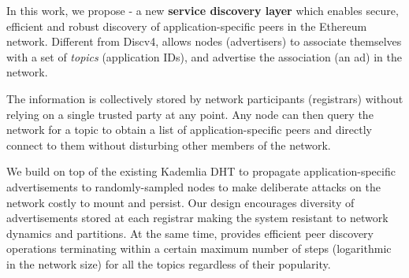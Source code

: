 


 In this work, we propose \sysname - a new \textbf{service discovery layer} which enables secure,  efficient and robust discovery of application-specific peers in the Ethereum network.
Different from Discv4, \sysname allows nodes (\ie advertisers) to associate themselves with a set of \emph{topics} (\eg application IDs), and advertise the association (\ie an ad) in the network. 

The information is collectively stored by network participants (\ie registrars) without relying on a single trusted party at any point. Any node can then query the network for a topic to obtain a list of application-specific peers and directly connect to them without disturbing other members of the network. 

We build \sysname on top of the existing Kademlia DHT to propagate application-specific advertisements to randomly-sampled nodes to make deliberate attacks on the network costly to mount and persist. Our design encourages diversity of advertisements stored at each registrar making the system resistant to network dynamics and partitions. At the same time, \sysname provides efficient peer discovery operations terminating within a certain maximum number of steps (logarithmic in the network size) for all the topics regardless of their popularity. 

